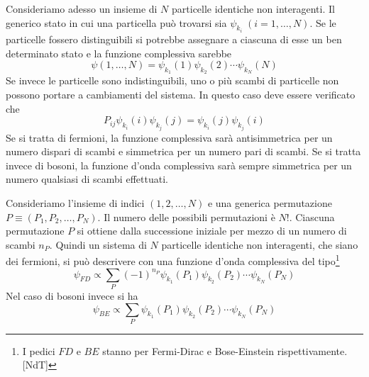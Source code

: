 Consideriamo adesso un insieme di $N$ particelle identiche non interagenti. Il
generico stato in cui una particella può trovarsi sia
$\psi_{k_i}\;(i=1,\dots,N)$. Se le particelle fossero distinguibili si potrebbe
assegnare a ciascuna di esse un ben determinato stato e la funzione complessiva
sarebbe
\[
\psi(1,\dots,N) = \psi_{k_1}(1)\psi_{k_2}(2)\cdots\psi_{k_N}(N)
\]
Se invece le particelle sono indistinguibili, uno o più scambi di particelle 
non
possono portare a cambiamenti del sistema. In questo caso deve essere verificato
che
\begin{equation}
 P_{ij}\psi_{k_i}(i)\psi_{k_j}(j) = \psi_{k_i}(j)\psi_{k_j}(i)
\end{equation}
Se si tratta di fermioni, la funzione complessiva sarà antisimmetrica per un
numero dispari di scambi e simmetrica per un numero pari di scambi. Se si tratta
invece di bosoni, la funzione d'onda complessiva sarà sempre simmetrica per un
numero qualsiasi di scambi effettuati.

Consideriamo l'insieme di indici $(1,2,\dots,N)$ e una generica permutazione
$P\equiv (P_1,P_2,\dots,P_N)$. Il numero delle possibili permutazioni è $N!$.
Ciascuna permutazione $P$ si ottiene dalla successione iniziale per mezzo di un
numero di scambi $n_P$. Quindi un sistema di $N$ particelle identiche non
interagenti, che siano dei fermioni, si può descrivere con una funzione d'onda
complessiva del tipo\footnote{I pedici $FD$ e $BE$ stanno per Fermi-Dirac e
Bose-Einstein rispettivamente. [NdT]}
\begin{equation}
 \psi_{FD} \propto 
\sum\limits_P(-1)^{n_P}\psi_{k_1}(P_1)\psi_{k_2}(P_2)\cdots\psi_{k_N}(P_N)
\end{equation}
Nel caso di bosoni invece si ha
\begin{equation}
 \psi_{BE} \propto 
\sum\limits_P\psi_{k_1}(P_1)\psi_{k_2}(P_2)\cdots\psi_{k_N}(P_N)
\end{equation}

